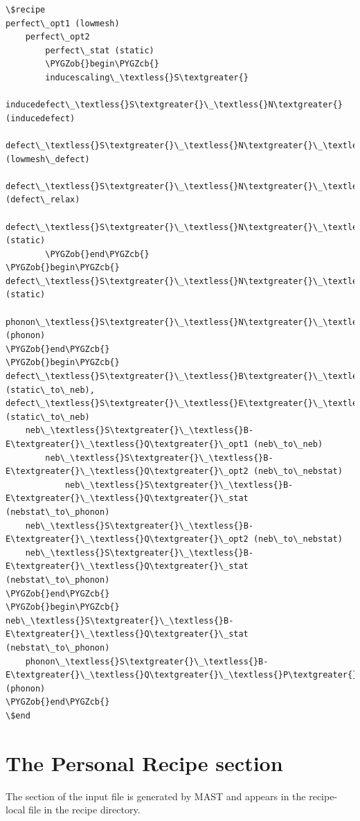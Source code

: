 \documentclass[letterpaper,10pt,english]{sphinxmanual}
\def\PYGZob{\char`\{}
\def\PYGZcb{\char`\}}
\begin{document}
\begin{Verbatim}[commandchars=\\\{\}]
\$recipe
perfect\_opt1 (lowmesh)
    perfect\_opt2
        perfect\_stat (static)
        \PYGZob{}begin\PYGZcb{}
        inducescaling\_\textless{}S\textgreater{}
            inducedefect\_\textless{}S\textgreater{}\_\textless{}N\textgreater{} (inducedefect)
                defect\_\textless{}S\textgreater{}\_\textless{}N\textgreater{}\_\textless{}Q\textgreater{}\_opt1 (lowmesh\_defect)
                    defect\_\textless{}S\textgreater{}\_\textless{}N\textgreater{}\_\textless{}Q\textgreater{}\_opt2 (defect\_relax)
                        defect\_\textless{}S\textgreater{}\_\textless{}N\textgreater{}\_\textless{}Q\textgreater{}\_stat (static)
        \PYGZob{}end\PYGZcb{}
\PYGZob{}begin\PYGZcb{}
defect\_\textless{}S\textgreater{}\_\textless{}N\textgreater{}\_\textless{}Q\textgreater{}\_stat (static)
    phonon\_\textless{}S\textgreater{}\_\textless{}N\textgreater{}\_\textless{}Q\textgreater{}\_\textless{}P\textgreater{} (phonon)
\PYGZob{}end\PYGZcb{}
\PYGZob{}begin\PYGZcb{}
defect\_\textless{}S\textgreater{}\_\textless{}B\textgreater{}\_\textless{}Q\textgreater{}\_stat (static\_to\_neb), defect\_\textless{}S\textgreater{}\_\textless{}E\textgreater{}\_\textless{}Q\textgreater{}\_stat (static\_to\_neb)
    neb\_\textless{}S\textgreater{}\_\textless{}B-E\textgreater{}\_\textless{}Q\textgreater{}\_opt1 (neb\_to\_neb)
        neb\_\textless{}S\textgreater{}\_\textless{}B-E\textgreater{}\_\textless{}Q\textgreater{}\_opt2 (neb\_to\_nebstat)
            neb\_\textless{}S\textgreater{}\_\textless{}B-E\textgreater{}\_\textless{}Q\textgreater{}\_stat (nebstat\_to\_phonon)
    neb\_\textless{}S\textgreater{}\_\textless{}B-E\textgreater{}\_\textless{}Q\textgreater{}\_opt2 (neb\_to\_nebstat)
    neb\_\textless{}S\textgreater{}\_\textless{}B-E\textgreater{}\_\textless{}Q\textgreater{}\_stat (nebstat\_to\_phonon)
\PYGZob{}end\PYGZcb{}
\PYGZob{}begin\PYGZcb{}
neb\_\textless{}S\textgreater{}\_\textless{}B-E\textgreater{}\_\textless{}Q\textgreater{}\_stat (nebstat\_to\_phonon)
    phonon\_\textless{}S\textgreater{}\_\textless{}B-E\textgreater{}\_\textless{}Q\textgreater{}\_\textless{}P\textgreater{} (phonon)
\PYGZob{}end\PYGZcb{}
\$end
\end{Verbatim}


\section{The Personal Recipe section}
\label{3_1_4_personalrecipe:the-personal-recipe-section}\label{3_1_4_personalrecipe::doc}
The  section of the input file is generated by MAST and appears in the recipe-local  file in the recipe directory.
\end{document}
